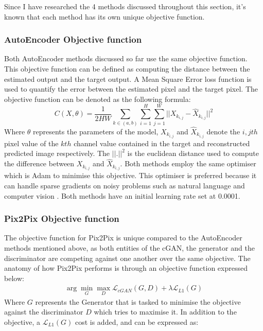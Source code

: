 Since I have researched the 4 methods discussed throughout this section, it's known that each method has its own unique objective function.

\subsubsection*{AutoEncoder Objective function}
Both AutoEncoder methods discussed so far use the same objective function. This objective function can be defined as computing the distance between the estimated output and the target output. A Mean Square Error loss function is used to quantify the error between the estimated pixel and the target pixel. The objective function can be denoted as the following formula:
\begin{equation}
C(X,\theta ) = \frac{1}{2HW}\sum_{k \in (a,b)}^{}\sum_{i=1}^{H}\sum_{j=1}^{W}||X_{k_{i,j}} - \hat{X}_{k_{i,j}} ||^2
\end{equation}
Where \(\theta\) represents the parameters of the model, \( X_{k_{i,j}} \) and \( \hat{X}_{k_{i,j}} \) denote the \(i,jth\) pixel value of the \(kth\) channel value contained in the target and reconstructed predicted image respectively. The \(||.||^2\) is the euclidean distance used to compute the difference between \( X_{k_{i,j}} \) and \( \hat{X}_{k_{i,j}} \). 
% 
Both methods employ the same optimiser which is Adam to minimise this objective. This optimiser is preferred because it can handle sparse gradients on noisy problems such as natural language and computer vision \cite{brownlee_2021}. 
Both methods have an initial learning rate set at 0.0001.



\subsubsection*{Pix2Pix Objective function}
The objective function for Pix2Pix is unique compared to the AutoEncoder methods mentioned above, as both entities of the cGAN, the generator and the discriminator are competing against one another over the same objective. The anatomy of how Pix2Pix performs is through an objective function expressed below:
$$
\begin{aligned}
\arg \min _{G} \max _{D} \mathcal{L}_{c G A N}(G, D)+\lambda \mathcal{L}_{L 1}(G)
\end{aligned}
$$
Where \(G\) represents the Generator that is tasked to minimise the objective against the discriminator \(D\) which tries to maximise it. In addition to the objective, a \(\mathcal{L}_{L 1}(G)\) cost is added, and can be expressed as:

